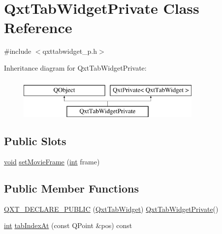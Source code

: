\hypertarget{class_qxt_tab_widget_private}{\section{Qxt\-Tab\-Widget\-Private Class Reference}
\label{class_qxt_tab_widget_private}
}


{\ttfamily \#include $<$qxttabwidget\-\_\-p.\-h$>$}

Inheritance diagram for Qxt\-Tab\-Widget\-Private\-:\begin{figure}[H]
\begin{center}
\leavevmode
\includegraphics[height=2.000000cm]{class_qxt_tab_widget_private}
\end{center}
\end{figure}
\subsection*{Public Slots}
\begin{DoxyCompactItemize}
\item 
\hyperlink{group___u_a_v_objects_plugin_ga444cf2ff3f0ecbe028adce838d373f5c}{void} \hyperlink{class_qxt_tab_widget_private_a580ef331600f1befa3285979d9639cdf}{set\-Movie\-Frame} (\hyperlink{ioapi_8h_a787fa3cf048117ba7123753c1e74fcd6}{int} frame)
\end{DoxyCompactItemize}
\subsection*{Public Member Functions}
\begin{DoxyCompactItemize}
\item 
\hyperlink{class_qxt_tab_widget_private_accd8404cde141baec2ed61253427fc81}{Q\-X\-T\-\_\-\-D\-E\-C\-L\-A\-R\-E\-\_\-\-P\-U\-B\-L\-I\-C} (\hyperlink{class_qxt_tab_widget}{Qxt\-Tab\-Widget}) \hyperlink{class_qxt_tab_widget_private}{Qxt\-Tab\-Widget\-Private}()
\item 
\hyperlink{ioapi_8h_a787fa3cf048117ba7123753c1e74fcd6}{int} \hyperlink{class_qxt_tab_widget_private_acbb00d6a3eb4fc0f720af84665da06e6}{tab\-Index\-At} (const Q\-Point \&pos) const 
\end{DoxyCompactItemize}
